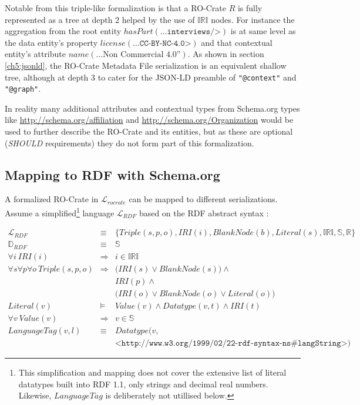Notable from this triple-like formalization is that a RO-Crate $R$ is fully represented as a tree at depth 2 helped by the use of $\mathbb{IRI}$  nodes. For instance the aggregation from the root entity $hasPart(\texttt{…interviews/>})$ is at same level as the data entity’s property $license(\texttt{…CC-BY-NC-4.0>})$ and that contextual entity’s attribute $ name(\text{…Non Commercial 4.0”})$. As shown in section \vref{ch5:jsonld}, the RO-Crate Metadata File serialization is an equivalent shallow tree, although at depth 3 to cater for the JSON-LD preamble of \texttt{"@context"} and \texttt{"@graph"}.

In reality many additional attributes and contextual types from Schema.org types like \url{http://schema.org/affiliation} and \url{http://schema.org/Organization} would be used to further describe the RO-Crate and its entities, but as these are optional (\textit{SHOULD} requirements) they do not form part of this formalization.


\subsection{Mapping to RDF with Schema.org}

A formalized RO-Crate in $\mathcal{L}_{rocrate}$ can be mapped to different serializations.
Assume a simplified\footnote{
 This simplification and mapping does not cover the extensive list of literal datatypes built into RDF 1.1, only strings and decimal real numbers. Likewise, $LanguageTag$ is deliberately not utillised below.
} language $\mathcal{L}_{RDF}$
based on the RDF abstract syntax \cite{RDF 1.1 2014}:

\small
\begin{eqnarray*}
\mathcal{L}_{RDF}           & \equiv &      \big\{ Triple(s,p,o), IRI(i), BlankNode(b), Literal(s),
    \mathbb{IRI}, \mathbb{S}, \mathbb{R}    \big\} \\
\mathbb{D}_{RDF}            & \equiv &      \mathbb{S} \\
\forall i \ IRI(i)          & \Rightarrow & i \in \mathbb{IRI} \\
\forall s \forall p \forall o \
    Triple(s,p,o)           & \Rightarrow & \Big( IRI(s) \lor BlankNode(s) \Big) \land  \\
                            & &             IRI(p) \land  \\
                            & &             \Big(IRI(o) \lor BlankNode(o) \lor Literal(o) \Big) \\
Literal(v)                  & \models &     Value(v) \land Datatype(v,t) \land IRI(t) \\
\forall v \ Value(v)        & \Rightarrow & v \in \mathbb{S} \\
LanguageTag(v, l)           & \equiv &      Datatype\big(v, \\
    && \texttt{<http://www.w3.org/1999/02/22-rdf-syntax-ns\#langString>}\big)
\end{eqnarray*}
\normalsize

